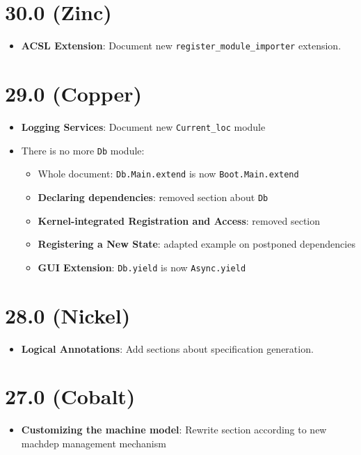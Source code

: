 \section*{30.0 (Zinc)}
\begin{itemize}
  \item \textbf{ACSL Extension}:
    Document new \verb+register_module_importer+ extension.
\end{itemize}


\section*{29.0 (Copper)}
\begin{itemize}
\item \textbf{Logging Services}: Document new \texttt{Current\_loc} module
\item There is no more \texttt{Db} module:
  \begin{itemize}
  \item Whole document: \texttt{Db.Main.extend} is now \texttt{Boot.Main.extend}
  \item \textbf{Declaring dependencies}: removed section about \texttt{Db}
  \item \textbf{Kernel-integrated Registration and Access}: removed section
  \item \textbf{Registering a New State}: adapted example on postponed dependencies
  \item \textbf{GUI Extension}: \texttt{Db.yield} is now \texttt{Async.yield}
  \end{itemize}
\end{itemize}

\section*{28.0 (Nickel)}
\begin{itemize}
\item \textbf{Logical Annotations}: Add sections about specification generation.
\end{itemize}

\section*{27.0 (Cobalt)}
\begin{itemize}
\item \textbf{Customizing the machine model}: Rewrite section according to new
  machdep management mechanism
\end{itemize}

